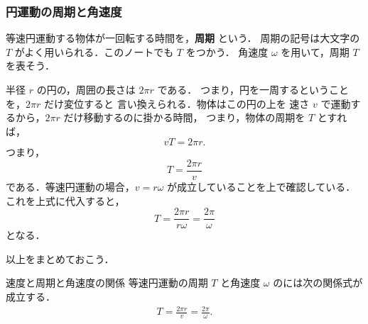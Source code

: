             \subsubsection{円運動の周期と角速度}
                    等速円運動する物体が一回転する時間を，\textbf{周期} という．
                    周期の記号は大文字の $T$ がよく用いられる．このノートでも $T$ をつかう．
                    角速度 $\omega$ を用いて，周期 $T$ を表そう．

                    半径 $r$ の円の，周囲の長さは $2\pi r$ である．
                    つまり，円を一周するということを，$2\pi r$ だけ変位すると
                    言い換えられる．物体はこの円の上を
                    速さ $v$ で運動するから，$2\pi r$ だけ移動するのに掛かる時間，
                    つまり，物体の周期を $T$ とすれば，
                        \begin{equation*}
                            vT = 2\pi r.
                        \end{equation*}
                    つまり，
                        \begin{equation*}
                            T  =  \frac{2\pi r}{v}
                        \end{equation*}
                    である．等速円運動の場合，$v=r\omega$ が成立していることを上で確認している．
                    これを上式に代入すると，
                        \begin{equation*}
                            T = \frac{2\pi r}{r\omega} = \frac{2\pi}{\omega}
                        \end{equation*}
                    となる．

                    以上をまとめておこう．
                    \begin{myshadebox}{速度と周期と角速度の関係}
                        等速円運動の周期 $T$ と角速度 $\omega$ のには次の関係式が
                        成立する．
                        \begin{align}
                            T  =  \frac{2\pi r}{v}  =  \frac{2\pi }{\omega}.
                        \end{align}
                    \end{myshadebox}


